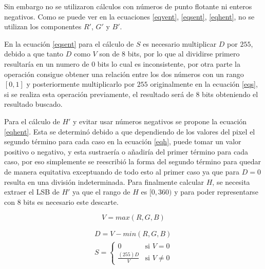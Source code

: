 \documentclass[twoside,spanish,ESP,MSc]{plantillaLabUPV}
\theoremstyle{definition}
\begin{document}
Sin embargo no se utilizaron cálculos con números de punto flotante ni enteros negativos. Como se puede ver en la ecuaciones \ref{eqvent}, \ref{eqsent}, \ref{eqhent}, no se utilizan los componentes $R'$, $G'$ y $B'$. 

En la ecuación \ref{eqsent} para el cálculo de $S$ es necesario multiplicar $D$ por $255$, debido a que tanto $D$ como $V$ son de 8 bits, por lo que al dividirse primero resultaría en un numero de $0$ bits lo cual es inconsistente, por otra parte la operación consigue obtener una relación entre los dos números con un rango $[0,1]$ y posteriormente multiplicarlo por $255$ originalmente en la ecuación \ref{eqs}, si se realiza esta operación previamente, el resultado será de 8 bits obteniendo el resultado buscado. 

Para el cálculo de $H'$ y evitar usar números negativos se propone la ecuación \ref{eqhent}. Esta se determinó debido a que dependiendo de los valores del pixel el segundo término para cada caso en la ecuación \ref{eqh}, puede tomar un valor positivo o negativo, y esta sustraería o añadiría del primer término para cada caso, por eso simplemente se reescribió la forma del segundo término para quedar de manera equitativa exceptuando de todo esto al primer caso ya que para $D=0$ resulta en una división indeterminada. Para finalmente calcular $H$, se necesita extraer el LSB de $H'$ ya que el rango de $H$ es $[0,360)$ y para poder representarse con 8 bits es necesario este descarte.  

\begin{equation} \label{eqvent}
V = max(R,G,B) 
\end{equation}

\begin{equation} \label{eqsent}
\begin{gathered}
D = V - min(R,G,B) \\
S = \left \{ \begin{matrix}
		0 & \mbox{si } V = 0 \\
		\frac{(255)D}{V} & \mbox{si } V \neq 0  
	\end{matrix}\right.
\end{gathered}
\end{equation}
\end{document}
